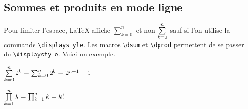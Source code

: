 \documentclass[12pt,a4paper]{article}
\begin{document}

	\subsection{Sommes et produits en mode ligne}

Pour limiter l'espace, \LaTeX{} affiche $\sum_{k=0}^{n}$ et non $\sum\limits_{k=0}^{n}$ sauf si l'on utilise la commande \verb+\displaystyle+.
Les macros \verb+\dsum+ et \verb+\dprod+ permettent de se passer de \verb+\displaystyle+.
Voici un exemple.


\begin{tcblisting}{}
$\dsum_{k=0}^{n} 2^k = \sum_{k=0}^{n} 2^k = 2^{n+1} - 1$

$\dprod_{k=1}^{n} k = \prod_{k=1}^{n} k = k !$
\end{tcblisting}
\end{document}
